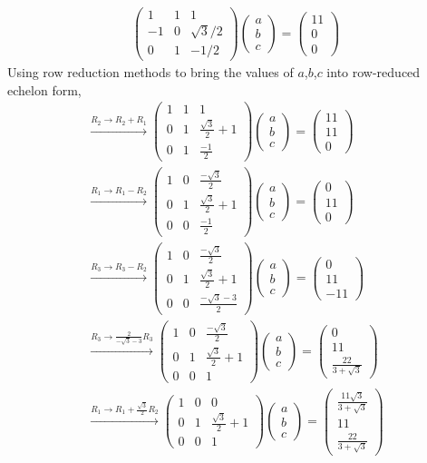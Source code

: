 \documentclass{article}
\newcommand{\myvec}[1]{\ensuremath{\begin{pmatrix}#1\end{pmatrix}}}
\begin{document}
  \begin{align}
	  \myvec{1 & 1 & 1\\-1 & 0 & \sqrt{3}/2\\0 &  1 & -1/2}\myvec{a \\ b \\c}= \myvec{11 \\ 0 \\ 0 }
  \end{align}
 Using row reduction methods to bring the values of $a$,$b$,$c$ into row-reduced echelon form,
 \begin{align}
     \xrightarrow[]{R_2 \rightarrow R_2+R_1}\myvec{1 & 1 & 1\\ 0 & 1 & \frac{\sqrt{3}}{2}+1\\0 &  1 & \frac{-1}{2}}\myvec{a \\ b \\ c}= \myvec{11 \\ 11 \\ 0 }\\
     \xrightarrow[]{R_1 \rightarrow R_1-R_2}\myvec{1 & 0 & \frac{-\sqrt{3}}{2}\\0 & 1 & \frac{\sqrt{3}}{2}+1\\0 &  0 & \frac{-1}{2}}\myvec{a \\ b \\ c}= \myvec{0 \\ 11 \\ 0 }\\
     \xrightarrow[]{R_3 \rightarrow R_3-R_2}\myvec{1 & 0 & \frac{-\sqrt{3}}{2}\\0 & 1 & \frac{\sqrt{3}}{2}+1\\0 &  0 & \frac{-\sqrt{3}-3}{2}}\myvec{a \\ b \\ c}= \myvec{0 \\ 11 \\ -11 }\\
     \xrightarrow[]{R_3 \rightarrow \frac{2}{-\sqrt{3}-3} R_3}\myvec{1 & 0 & \frac{-\sqrt{3}}{2}\\0 & 1 & \frac{\sqrt{3}}{2}+1\\0 &  0 & 1}\myvec{a \\ b \\ c}= \myvec{0 \\ 11 \\ \frac{22}{3+\sqrt{3}} }\\
     \xrightarrow[]{R_1 \rightarrow R_1+\frac{\sqrt{3}}{2}R_2}\myvec{1 & 0 & 0 \\ 0 & 1 & \frac{\sqrt{3}}{2}+1\\0 &  0 & 1}\myvec{a \\ b \\ c}= \myvec{\frac{11\sqrt{3}}{3+\sqrt{3}} \\ 11 \\\frac{22}{3+\sqrt{3}}  }\\

\end{align}
\end{document}
